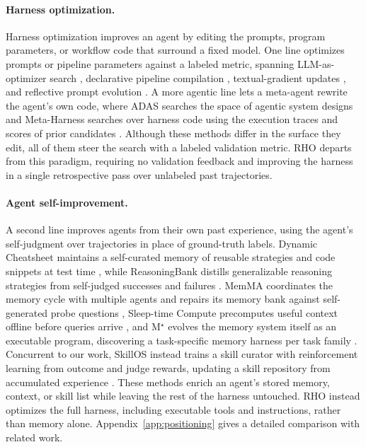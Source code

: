 \documentclass{llmxive}
\providecommand{\method}{\textsc{RHO}}
\begin{document}
\paragraph{Harness optimization.}
Harness optimization improves an agent by editing the prompts, program parameters, or workflow code that surround a fixed model.
One line optimizes prompts or pipeline parameters against a labeled metric, spanning LLM-as-optimizer search \citep{yang2023opro}, declarative pipeline compilation \citep{khattab2023dspy}, textual-gradient updates \citep{yuksekgonul2024textgrad}, and reflective prompt evolution \citep{agrawal2025gepa}.
A more agentic line lets a meta-agent rewrite the agent's own code, where ADAS searches the space of agentic system designs \citep{hu2024adas} and Meta-Harness searches over harness code using the execution traces and scores of prior candidates \citep{lee2026metaharness}.
Although these methods differ in the surface they edit, all of them steer the search with a labeled validation metric.
\method{} departs from this paradigm, requiring no validation feedback and improving the harness in a single retrospective pass over unlabeled past trajectories.

\paragraph{Agent self-improvement.}
 A second line improves agents from their own past experience, using the agent's self-judgment over trajectories in place of ground-truth labels.
Dynamic Cheatsheet maintains a self-curated memory of reusable strategies and code snippets at test time \citep{suzgun2025dynamiccheatsheet}, while ReasoningBank distills generalizable reasoning strategies from self-judged successes and failures \citep{ouyang2026reasoningbank}.
MemMA coordinates the memory cycle with multiple agents and repairs its memory bank against self-generated probe questions \citep{lin2026memma}, Sleep-time Compute precomputes useful context offline before queries arrive \citep{lin2025sleeptime}, and M$^\star$ evolves the memory system itself as an executable program, discovering a task-specific memory harness per task family \citep{pan2026mstar}.
Concurrent to our work, SkillOS instead trains a skill curator with reinforcement learning from outcome and judge rewards, updating a skill repository from accumulated experience \citep{ouyang2026skillos}.
These methods enrich an agent's stored memory, context, or skill list while leaving the rest of the harness untouched.
\method{} instead optimizes the full harness, including executable tools and instructions, rather than memory alone.
Appendix~\ref{app:positioning} gives a detailed comparison with related work.
\end{document}
